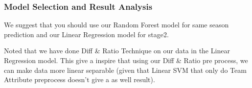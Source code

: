 \subsubsection*{Model Selection and Result Analysis}
\par We suggest that you should use our Random Forest model for same season prediction and our Linear Regression model for stage2. 
\par Noted that we have done Diff \& Ratio Technique on our data in the Linear Regression model. This give a inspire that using our Diff \& Ratio pre process, we can make data more linear separable (given that Linear SVM that only do Team Attribute preprocess doesn't give a as well result).
